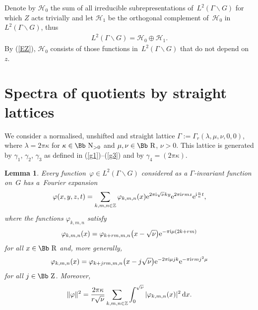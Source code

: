 \documentclass[pdftex]{sigma}
\newcommand\RR{{\mbox{\Bb R}}}
\newcommand\NN{{\mbox{\Bb N}}}
\newcommand\ZZ{{\mbox{\Bb Z}}}
\newcommand\Z{{\mathbb Z}}
\newcommand\cH{{\mathcal H}}
\newcommand\ph{\varphi}
\numberwithin{equation}{section}
\newtheorem{Lemma}[Theorem]{Lemma}
\begin{document}
Denote by $\cH_0$ the sum of all irreducible subrepresentations of~$L^2(\Gamma\backslash G)$ for which $Z$ acts trivially and let $\cH_1$ be the orthogonal complement of~$\cH_0$ in~$L^2(\Gamma\backslash G)$, thus
\begin{gather*}
L^2(\Gamma\backslash G)=\cH_0 \oplus \cH_1.
\end{gather*}
By (\ref{EZ}), $\cH_0$ consists of those functions in~$L^2(\Gamma\backslash G)$ that do not depend on~$z$.

\section{Spectra of quotients by straight lattices}
We consider a normalised, unshifted and straight lattice $\Gamma:=\Gamma_r(\lambda,\mu,\nu,0,0)$, where $\lambda=2\pi \kappa$ for $\kappa\in\NN_{>0}$ and $\mu,\nu\in\RR$, $\nu>0$. This lattice is generated by $\gamma_1$, $\gamma_2$, $\gamma_3$ as defined in (\ref{g1})--(\ref{g3}) and by $\gamma_4=(2\pi\kappa)$.
%
\begin{Lemma}
Every function~$\ph\in L^2(\Gamma\backslash G)$ considered as a $\Gamma$-invariant function on~$G$ has a~Fourier expansion
\begin{gather}\label{EF}
\varphi(x,y,z,t)=\sum_{k,m,n\in\Z}\varphi_{k,m,n}(x){\rm e}^{2\pi {\rm i}\sqrt\nu ky}{\rm e}^{2\pi {\rm i}rmz}{\rm e}^{{\rm i} \frac n\kappa t},
\end{gather}
where the functions $\ph_{k,m,n}$ satisfy
\begin{gather}\label{eq:varphikmn}
\varphi_{k,m,n}(x)=\varphi_{k+rm,m,n}\big(x-\sqrt\nu\big) {\rm e}^{-\pi {\rm i}\mu (2k+rm)}
\end{gather}
for all $x\in\RR$ and, more generally,
\begin{gather}\label{eq:varphikmn2}
\varphi_{k,m,n}(x)=\varphi_{k+jrm,m,n}\big(x-j\sqrt\nu\big) {\rm e}^{-2\pi {\rm i}\mu jk} {\rm e}^{-\pi {\rm i}rmj^2\mu}
\end{gather}
for all $j\in\ZZ$.
Moreover,
\begin{gather}\label{EL2}
\|\varphi\|^2 =\frac{2\pi \kappa}{r\sqrt\nu}\sum_{k,m,n\in\Z}\int_0^{\sqrt\nu}|\varphi_{k,m,n}(x)|^2\,{\rm d}x.
\end{gather}
\end{Lemma}
\end{document}
